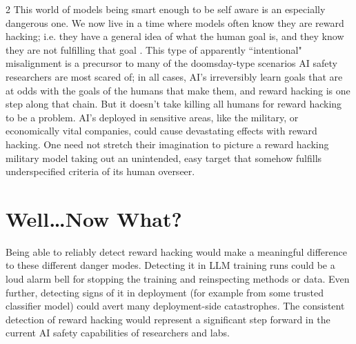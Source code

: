 \documentclass{article}
\begin{document}
\begin{multicols}{2}
This world of models being smart enough to be self aware is an especially dangerous one. We now live in a time where models often know they are reward hacking; i.e. they have a general idea of what the human goal is, and they know they are not fulfilling that goal \citep{metr-reward-hack}. This type of apparently ``intentional" misalignment is a precursor to many of the doomsday-type scenarios AI safety researchers are most scared of; in all cases, AI's irreversibly learn goals that are at odds with the goals of the humans that make them, and reward hacking is one step along that chain. But it doesn't take killing all humans for reward hacking to be a problem. AI's deployed in sensitive areas, like the military, or economically vital companies, could cause devastating effects with reward hacking. One need not stretch their imagination to picture a reward hacking military model taking out an unintended, easy target that somehow fulfills underspecified criteria of its human overseer. 

\section{Well\dots Now What?}

Being able to reliably detect reward hacking would make a meaningful difference to these different danger modes. Detecting it in LLM training runs could be a loud alarm bell for stopping the training and reinspecting methods or data. Even further, detecting signs of it in deployment (for example from some trusted classifier model) could avert many deployment-side catastrophes. The consistent detection of reward hacking would represent a significant step forward in the current AI safety capabilities of researchers and labs.
\end{multicols}



\end{document}
